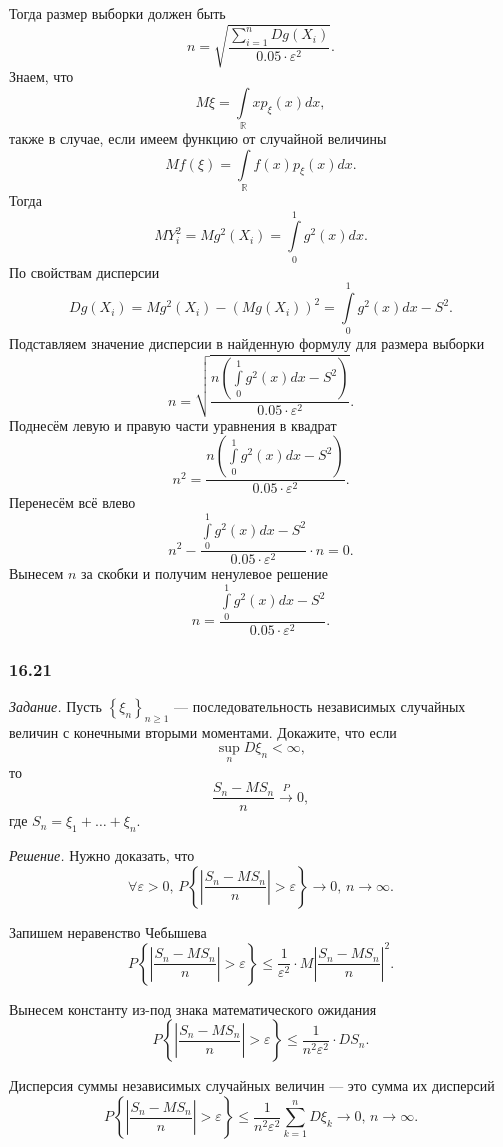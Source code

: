 Тогда размер выборки должен быть
$$n =
  \sqrt{ \frac{ \sum \limits_{i = 1}^n Dg \left( X_i \right) }{0.05 \cdot \varepsilon^2}}.$$
Знаем, что
$$M \xi =
  \int \limits_{ \mathbb{R}} x p_{ \xi } \left( x \right) dx,$$
также в случае, если имеем функцию от случайной величины
$$Mf \left( \xi \right) =
  \int \limits_{ \mathbb{R}} f \left( x \right) p_{ \xi } \left( x \right) dx.$$
Тогда
$$MY_i^2 =
  Mg^2 \left( X_i \right) =
  \int \limits_0^1 g^2 \left( x \right) dx.$$
По свойствам дисперсии
$$Dg \left( X_i \right) =
  Mg^2 \left( X_i \right) - \left( Mg \left( X_i \right) \right)^2 =
  \int \limits_0^1 g^2 \left( x \right) dx - S^2.$$
Подставляем значение дисперсии в найденную формулу для размера выборки
$$n =
  \sqrt{
    \frac{n \left( \int \limits_0^1 g^2 \left( x \right) dx - S^2 \right) }{0.05 \cdot \varepsilon^2}
  }.$$
Поднесём левую и правую части уравнения в квадрат
$$n^2 =
  \frac{n \left(
      \int \limits_0^1 g^2 \left( x \right) dx - S^2
    \right) }{0.05 \cdot \varepsilon^2}.$$
Перенесём всё влево
$$n^2 - \frac{\int \limits_0^1 g^2 \left( x \right) dx - S^2}{0.05 \cdot \varepsilon^2} \cdot n =
  0.$$
Вынесем $n$ за скобки и получим ненулевое решение
$$n =
  \frac{\int \limits_0^1 g^2 \left( x \right) dx - S^2}{0.05 \cdot \varepsilon^2}.$$

\subsubsection*{16.21}

\textit{Задание.}
Пусть $ \left\{ \xi_n \right\}_{n \geq 1}$ ---
последовательность независимых случайных величин с конечными вторыми моментами.
Докажите, что если
$$ \sup \limits_n D \xi_n <
  \infty,$$
то
$$ \frac{S_n - MS_n}{n} \overset{P}{ \rightarrow } 0,$$
где $S_n = \xi_1 + \dotsc + \xi_n$.

\textit{Решение.} Нужно доказать, что
$$ \forall \varepsilon > 0, \,
  P \left\{ \left| \frac{S_n - MS_n}{n} \right| > \varepsilon \right\} \to 0, \,
  n \to \infty.$$

Запишем неравенство Чебышева
$$P \left\{ \left| \frac{S_n - MS_n}{n} \right| > \varepsilon \right\} \leq
  \frac{1}{ \varepsilon^2} \cdot M \left| \frac{S_n - MS_n}{n} \right|^2.$$

Вынесем константу из-под знака математического ожидания
$$P \left\{ \left| \frac{S_n - MS_n}{n} \right| > \varepsilon \right\} \leq
  \frac{1}{n^2 \varepsilon^2} \cdot DS_n.$$

Дисперсия суммы независимых случайных величин --- это сумма их дисперсий
$$P \left\{ \left| \frac{S_n - MS_n}{n} \right| > \varepsilon \right\} \leq
  \frac{1}{n^2 \varepsilon^2} \sum \limits_{k = 1}^n D \xi_k \to
  0, \,
  n \to \infty.$$
